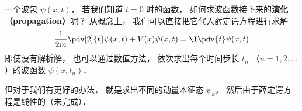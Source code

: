 
一个波包 $\psi(x, t)$， 若我们知道 $t = 0$ 时的函数， 如何求波函数接下来的\textbf{演化（propagation）}呢？ 从概念上， 我们可以直接把它代入薛定谔方程进行求解
\begin{equation}
\frac{1}{2m}\pdv[2]{t}\psi(x, t) + V(x) \psi(x, t) = \I \pdv{t} \psi(x, t)
\end{equation}
即使没有解析解， 也可以通过数值方法， 依次求出每个时间步长 $t_n$ （$n = 1, 2, \dots$）的波函数 $\psi(x, t_n)$． %

但对于我们有更好的办法， 就是求出不同的动量本征态 $\psi_k$， 然后由于薛定谔方程是线性的（未完成）．

